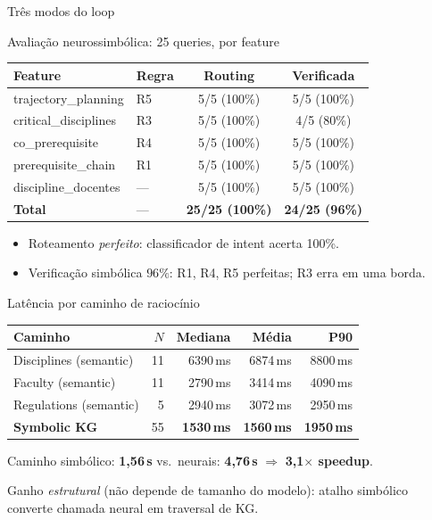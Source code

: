 \documentclass[aspectratio=169]{beamer}
\begin{document}
\begin{frame}{Três modos do loop}
\begin{frame}{Avaliação neurossimbólica: 25 queries, por feature}
  \begin{table}\centering\small
    \begin{tabular}{llcc}
      \toprule
      \textbf{Feature} & \textbf{Regra} & \textbf{Routing} & \textbf{Verificada} \\
      \midrule
      trajectory\_planning      & R5 & 5/5 (100\%) & 5/5 (100\%) \\
      critical\_disciplines     & R3 & 5/5 (100\%) & 4/5 (80\%)  \\
      co\_prerequisite          & R4 & 5/5 (100\%) & 5/5 (100\%) \\
      prerequisite\_chain       & R1 & 5/5 (100\%) & 5/5 (100\%) \\
      discipline\_docentes      & --- & 5/5 (100\%) & 5/5 (100\%) \\
      \midrule
      \textbf{Total}            & --- & \textbf{25/25 (100\%)} & \textbf{24/25 (96\%)} \\
      \bottomrule
    \end{tabular}
  \end{table}
  \vspace{0.5em}
  \begin{itemize}\small
    \item Roteamento \emph{perfeito}: classificador de intent acerta 100\%.
    \item Verificação simbólica $96\%$: R1, R4, R5 perfeitas; R3 erra em uma borda.
  \end{itemize}
\end{frame}

\begin{frame}{Latência por caminho de raciocínio}
  \begin{table}\centering\small
    \begin{tabular}{lrrrr}
      \toprule
      \textbf{Caminho} & \textbf{$N$} & \textbf{Mediana} & \textbf{Média} & \textbf{P90} \\
      \midrule
      Disciplines (semantic)   & 11 & 6390\,ms & 6874\,ms & 8800\,ms \\
      Faculty (semantic)       & 11 & 2790\,ms & 3414\,ms & 4090\,ms \\
      Regulations (semantic)   & 5  & 2940\,ms & 3072\,ms & 2950\,ms \\
      \textbf{Symbolic KG}     & 55 & \textbf{1530\,ms} & \textbf{1560\,ms} & \textbf{1950\,ms} \\
      \bottomrule
    \end{tabular}
  \end{table}
  \vspace{0.5em}
  \begin{center}
    Caminho simbólico: \textbf{1,56\,s} vs.\ neurais: \textbf{4,76\,s} $\Rightarrow$ \textbf{3{,}1$\times$ speedup}.
  \end{center}
  \small Ganho \emph{estrutural} (não depende de tamanho do modelo): atalho simbólico converte chamada neural em traversal de KG.
\end{frame}


\end{frame}
\end{document}

